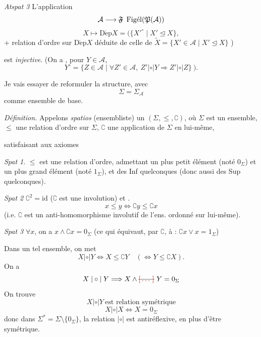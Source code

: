 \documentclass[11pt,a4paper]{article}
\begin{document}
\emph{Atspat 3} \quad L'application
\[
  \mathcal{A} \longrightarrow
  \text{\struck{$\mathfrak{F}$}}\ \operatorname{Fig\acute{e}l}(\mathfrak{P}(\mathcal{A}))
\]
\[
  X \longmapsto \operatorname{D\acute{e}p} X
  = \bigl( \{ X'^{\circ} \mid X' \trianglelefteq X \} ,
\]
 + relation d'ordre sur $\operatorname{D\acute{e}p} X$ déduite
de celle de
$\widetilde{X} = \{ X' \in \mathcal{A} \mid X' \trianglelefteq X \}$ )

est \emph{injective}. (On a , pour
$Y \in \mathcal{A}$,
\[
  Y^{\circ} = \{ Z \in \mathcal{A} \mid \forall Z' \in \mathcal{A},\
  Z' \mathrel{|\circ|} Y \Rightarrow Z' \mathrel{|\circ|} Z \} \ ) .
\]

Je vais essayer de reformuler la structure, avec
\[
  \Sigma = \Sigma_{\mathcal{A}}
\]
comme ensemble de base.

\emph{Définition.} Appelons \emph{spatios} (ensembliste) un
  $(\Sigma, \leq, \complement)$, où
$\Sigma$ est un ensemble, $\leq$ une relation d'ordre sur $\Sigma$,
$\complement$ une application de $\Sigma$ en lui-même,


satisfaisant aux axiomes

\emph{Spat 1}. $\leq$ est une relation d'ordre, admettant un plus petit
élément (noté $0_{\Sigma}$) et un plus grand élément (noté $1_{\Sigma}$), et
\uncertain{on admet} des Inf quelconques (donc aussi des Sup quelconques).

\emph{Spat 2} \quad {} $\complement^{2} = \mathrm{id}$
($\complement$ est une involution) et \struck{\ill{}}.
\[
  x \leq y \iff \complement y \leq \complement x
\]
(i.e. $\complement$ est un anti-homomorphisme involutif de l'ens. ordonné sur
lui-même).

\emph{Spat 3} \quad $\forall x$, on a
$x \wedge \complement x = 0_{\Sigma}$ (ce qui équivaut, par $\complement$, à :
$\complement x \vee x = 1_{\Sigma}$)

Dans un tel ensemble, on met
\[
  X \mathrel{|\circ|} Y \iff X \leq \complement Y
  \quad (\iff Y \leq \complement X) .
\]
On a
\[
  X \mathrel{|\circ|} Y \Longrightarrow X \wedge \text{\struck{\ill{}}}\ Y = 0_{\Sigma}
\]
On trouve
\[
  X \mathrel{|\circ|} Y \ \text{est relation symétrique}
\]
\[
  X \mathrel{|\circ|} X \iff X = 0_{\Sigma}
\]
donc dans $\Sigma^{*} = \Sigma \setminus \{ 0_{\Sigma} \}$, la relation
$\mathrel{|\circ|}$ est antiréflexive, en plus d'être symétrique.
\end{document}
